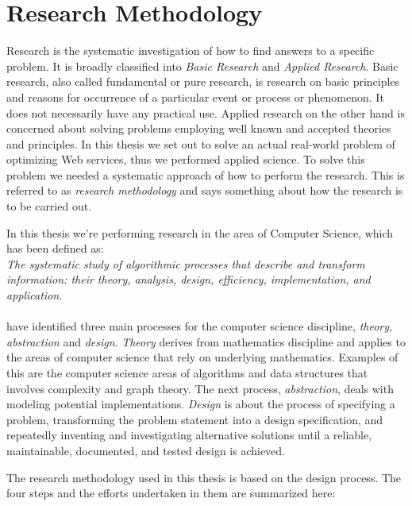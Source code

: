 \section{Research Methodology}

Research is the systematic investigation of how to find answers to a specific
problem. It is broadly classified into \textit{Basic Research} and
\textit{Applied Research}\cite{rajasekar2006research}. Basic research, also
called fundamental or pure research, is research on basic principles and reasons
for occurrence of a particular event or process or phenomenon. It does not
necessarily have any practical use. Applied research on the other hand is
concerned about solving problems employing well known and accepted theories and
principles. In this thesis we set out to solve an actual real-world problem of
optimizing Web services, thus we performed applied science. To solve this
problem we needed a systematic approach of how to perform the research. This is
referred  to as \textit{research methodology} and says something about how the
research is to be carried out.

In this thesis we're performing research in the area of Computer Science, which
has been defined as\cite{denning}: \\

\textit{The systematic study of algorithmic processes that
describe and transform information: their theory, analysis, design, efficiency,
implementation, and application}.

\paragraph{}

 \citeauthor{denning} have identified three main processes for the computer science
 discipline, \textit{theory, abstraction} and \textit{design}\cite{denning}.
 \textit{Theory} derives from mathematics discipline and applies to the areas of
 computer science that rely on underlying mathematics. Examples of this are
 the computer science areas of algorithms and data structures that involves
 complexity and graph theory. The next process, \textit{abstraction}, deals with
 modeling potential implementations. \textit{Design} is about the process of
 specifying a problem, transforming the problem statement into a design
 specification, and repeatedly inventing and investigating alternative solutions
 until a reliable, maintainable, documented, and tested design is achieved.

The research methodology used in this thesis is based on the design process. The
four steps and the efforts undertaken in them are summarized here:

